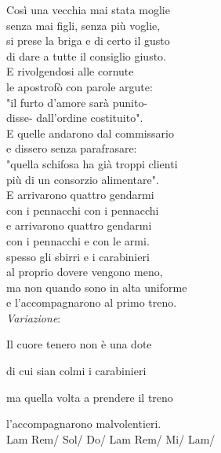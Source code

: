 \documentclass[10pt, twoside, a4paper]{article}
\begin{document}
\begin{multicols}{2}
Cos\`i una vecchia mai stata moglie \\
senza mai figli, senza pi\`u voglie, \\
si prese la briga e di certo il gusto \\
di dare a tutte il consiglio giusto. \\

E rivolgendosi alle cornute \\
le apostrof\`o con parole argute: \\
"il furto d'amore sar\`a punito- \\
disse- dall'ordine costituito". \\

E quelle andarono dal commissario \\
e dissero senza parafrasare: \\
"quella schifosa ha gi\`a troppi clienti \\
pi\`u di un consorzio alimentare". \\

E arrivarono quattro gendarmi \\
con i pennacchi con i pennacchi \\
e arrivarono quattro gendarmi \\
con i pennacchi e con le armi. \\

spesso gli sbirri e i carabinieri \\
al proprio dovere vengono meno, \\
ma non quando sono in alta uniforme \\
e l'accompagnarono al primo treno. \\

\textit{Variazione}:

\hspace{36pt}Il cuore tenero non \`e una dote

\hspace{36pt}di cui sian colmi i carabinieri

\hspace{36pt}ma quella volta a prendere il treno

\hspace{36pt}l'accompagnarono malvolentieri.\\

Lam Rem/ Sol/ Do/ Lam Rem/ Mi/ Lam/
\end{multicols}
\newpage
\end{document}
